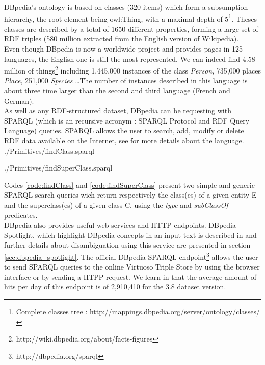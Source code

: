 DBpedia's ontology is based on classes (320 items) which form a subsumption hierarchy, the root element being owl:Thing, with a maximal depth of 5\footnote{Complete classes tree : http://mappings.dbpedia.org/server/ontology/classes/}. Theses classes are described by a total of 1650 different properties, forming a large set of RDF triples (580 million extracted from the English version of Wikipedia).\\

Even though DBpedia is now a worldwide project and provides pages in 125 languages, the English one is still the most represented. We can indeed find 4.58 million of things\footnote{http://wiki.dbpedia.org/about/facts-figures} including 1,445,000 instances of the class \textit{Person}, 735,000 places \textit{Place}, 251,000 \textit{Species} \dots The number of instances described in this language is about three time larger than the second and third language (French and German). \\

As well as any RDF-structured dataset, DBpedia can be requesting with SPARQL (which is an recursive acronym : SPARQL Protocol and RDF Query Language) queries. SPARQL allows the user to search, add, modify or delete RDF data available on the Internet, see \cite{prud2008sparql} for more details about the language. \\


	{./Primitives/findClass.sparql}


	{./Primitives/findSuperClass.sparql}

Codes \ref{code:findClass} and \ref{code:findSuperClass} present two simple and generic SPARQL search queries wich return respectively the class(es) of a given entity E and the superclass(es) of a given class C. using the \textit{type} and \textit{subClassOf} predicates.\\

DBpedia also provides useful web services and HTTP endpoints. DBpedia Spotlight, which highlight DBpedia concepts in an input text is described in \cite{mendes2011dbpedia} and further details about disambiguation using this service are presented in section \ref{sec:dbpedia_spotlight}. The official DBpedia SPARQL endpoint\footnote{http://dbpedia.org/sparql} allows the user to send SPARQL queries to the online Virtuoso Triple Store by using the browser interface or by sending a HTPP request. We learn in \cite{lehmann2014dbpedia} that the average amount of hits per day of this endpoint is of 2,910,410 for the 3.8 dataset version. \\

